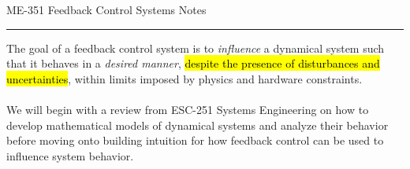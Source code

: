 ﻿\documentclass[12pt]{article}
\begin{document}
\begin{center}
{\LARGE ME-351 Feedback Control Systems Notes\par}
\end{center}
\hrule
\vspace{1.5em}
The goal of a feedback control system is to \textit{influence} a dynamical system such that it behaves in a \textit{desired manner}, \hl{despite the presence of disturbances and uncertainties}, within limits imposed by physics and hardware constraints.\\\\
We will begin with a review from ESC-251 Systems Engineering on how to develop mathematical models of dynamical systems and analyze their behavior before moving onto building intuition for how feedback control can be used to influence system behavior.
\begin{center}
    {\LARGE\bfseries {}\par}
\end{center}
\end{document}
